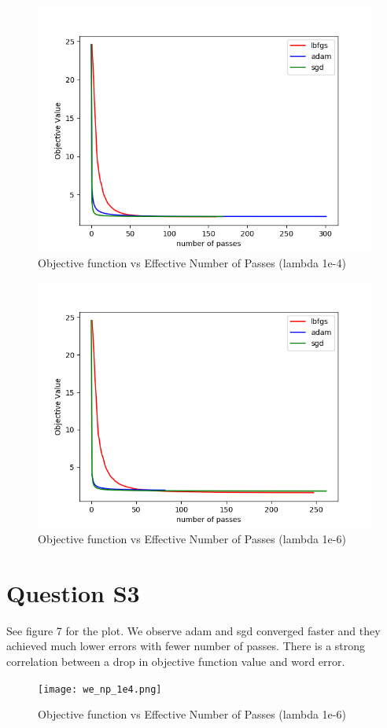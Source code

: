 \documentclass[11pt]{report}
\begin{document}
\begin{figure}[b]
\centering
\includegraphics[scale=0.4]{objval_ef_1e4.png}
\caption{Objective function vs Effective Number of Passes (lambda 1e-4)}
\end{figure}

\begin{figure}[b]
\centering
\includegraphics[scale=0.4]{objval_ef_1e6.png}
\caption{Objective function vs Effective Number of Passes (lambda 1e-6)}
\end{figure}
\section*{Question S3}
See figure 7 for the plot. We observe adam and sgd converged faster and
they achieved much lower errors with fewer number of passes. There is
a strong correlation between a drop in objective function value and
word error.

\begin{figure}[b]
\centering
\texttt{[image: we\_np\_1e4.png]}
\caption{Objective function vs Effective Number of Passes (lambda 1e-6)}
\end{figure}
\end{document}
